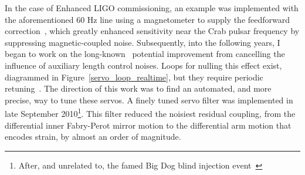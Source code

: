 In the case of Enhanced LIGO commissioning, an example was implemented with the aforementioned 60 Hz line using a magnetometer to supply the feedforward correction~\cite{SmithThesis}, which greatly enhanced sensitivity near the Crab pulsar frequency by suppressing magnetic-coupled noise.
Subsequently, into the following years, I began to work on the long-known~\cite{AdhikariThesis,BallmerThesis} potential improvement from cancelling the influence of auxiliary length control noises.
Loops for nulling this effect exist, diagrammed in Figure~\ref{servo_loop_realtime}, but they require periodic retuning~\cite{KissellPRCMICH}.  
The direction of this work was to find an automated, and more precise, way to tune these servos.
A finely tuned servo filter was implemented in late September 2010\footnote{After, and unrelated to, the famed Big Dog blind injection event~\cite{Riles2013}}.
This filter reduced the noisiest residual coupling, from the differential inner Fabry-Perot mirror motion to the differential arm motion that encodes strain, by almost an order of magnitude. 


